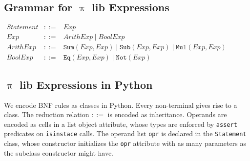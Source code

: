 \documentclass[a4paper,openany]{book}
\begin{document}
\subsection{Grammar for $\uppi$ lib
Expressions}\label{grammar-for-ux3c0-lib-expressions}

\(\begin{array}{rcl} Statement & ::= & Exp \\ Exp & ::= & ArithExp \mid BoolExp \\ ArithExp & ::= & \mathtt{Sum}(Exp, Exp)\mid \mathtt{Sub}(Exp, Exp) \mid \mathtt{Mul}(Exp, Exp) \\ BoolExp & ::= & \mathtt{Eq}(Exp, Exp) \mid \mathtt{Not}(Exp) \end{array}\)

    \subsection{$\uppi$ lib Expressions in
Python}\label{ux3c0-lib-expressions-in-python}

We encode BNF rules as classes in Python. Every non-terminal gives rise
to a class. The reduction relation \(::=\) is encoded as inheritance.
Operands are encoded as cells in a list object attribute, whose types
are enforced by \texttt{assert} predicates on \texttt{isinstace} calls.
The operand list \texttt{opr} is declared in the \texttt{Statement}
class, whose constructor initializes the \texttt{opr} attribute with as
many parameters as the subclass constructor might have.
\end{document}
